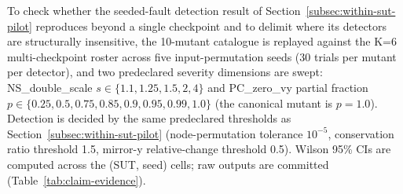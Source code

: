 \documentclass[preprint,12pt]{elsarticle}
\begin{document}
To check whether the seeded-fault detection result of Section~\ref{subsec:within-sut-pilot} reproduces beyond a single checkpoint and to delimit where its detectors are structurally insensitive, the 10-mutant catalogue is replayed against the K=6 multi-checkpoint roster across five input-permutation seeds (30 trials per mutant per detector), and two predeclared severity dimensions are swept: NS\_double\_scale $s \in \{1.1, 1.25, 1.5, 2, 4\}$ and PC\_zero\_vy partial fraction $p \in \{0.25, 0.5, 0.75, 0.85, 0.9, 0.95, 0.99, 1.0\}$ (the canonical mutant is $p = 1.0$). Detection is decided by the same predeclared thresholds as Section~\ref{subsec:within-sut-pilot} (node-permutation tolerance $10^{-5}$, conservation ratio threshold 1.5, mirror-y relative-change threshold 0.5). Wilson 95\% CIs are computed across the (SUT, seed) cells; raw outputs are committed (Table~\ref{tab:claim-evidence}).
\end{document}
